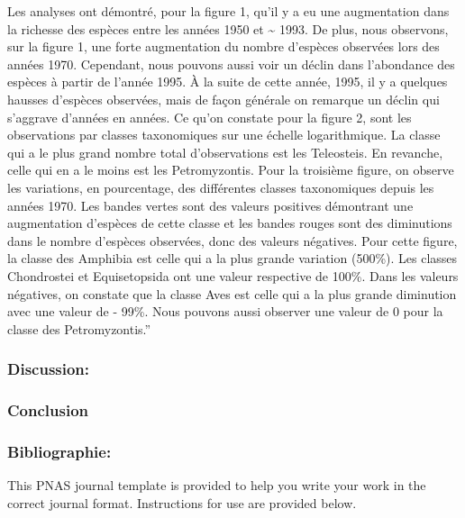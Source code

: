 \documentclass[9pt,twocolumn,twoside,]{pnas-new}
\begin{document}
Les analyses ont démontré, pour la figure 1, qu'il y a eu une
augmentation dans la richesse des espèces entre les années 1950 et
\textasciitilde{} 1993. De plus, nous observons, sur la figure 1, une
forte augmentation du nombre d'espèces observées lors des années 1970.
Cependant, nous pouvons aussi voir un déclin dans l'abondance des
espèces à partir de l'année 1995. À la suite de cette année, 1995, il y
a quelques hausses d'espèces observées, mais de façon générale on
remarque un déclin qui s'aggrave d'années en années. Ce qu'on constate
pour la figure 2, sont les observations par classes taxonomiques sur une
échelle logarithmique. La classe qui a le plus grand nombre total
d'observations est les Teleosteis. En revanche, celle qui en a le moins
est les Petromyzontis. Pour la troisième figure, on observe les
variations, en pourcentage, des différentes classes taxonomiques depuis
les années 1970. Les bandes vertes sont des valeurs positives démontrant
une augmentation d'espèces de cette classe et les bandes rouges sont des
diminutions dans le nombre d'espèces observées, donc des valeurs
négatives. Pour cette figure, la classe des Amphibia est celle qui a la
plus grande variation (500\%). Les classes Chondrostei et Equisetopsida
ont une valeur respective de 100\%. Dans les valeurs négatives, on
constate que la classe Aves est celle qui a la plus grande diminution
avec une valeur de - 99\%. Nous pouvons aussi observer une valeur de 0
pour la classe des Petromyzontis.''

\subsubsection{Discussion:}\label{discussion}

\subsubsection{Conclusion}\label{conclusion}

\subsubsection{Bibliographie:}\label{bibliographie}

This PNAS journal template is provided to help you write your work in
the correct journal format. Instructions for use are provided below.

\showmatmethods
\showacknow
\pnasbreak



% 
\end{document}
